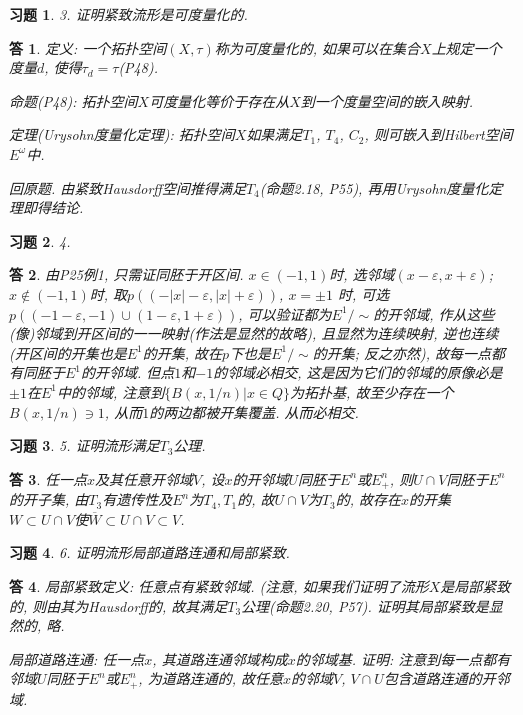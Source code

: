\documentclass{ctexart}%
\newtheorem*{exercise}{习题}
\newtheorem*{solution}{答}
\theoremstyle{definition}
\theoremstyle{remark}
\begin{document}
\begin{exercise}3. 证明紧致流形是可度量化的.
\end{exercise}
\begin{solution}
定义: 一个拓扑空间$(X,\tau)$称为可度量化的, 如果可以在集合$X$上规定一个度量$d$, 使得$\tau_d=\tau$(P48).

命题(P48): 拓扑空间$X$可度量化等价于存在从$X$到一个度量空间的嵌入映射. 

定理(Urysohn度量化定理): 拓扑空间$X$如果满足$T_1$, $T_4$, $C_2$, 则可嵌入到Hilbert空间$E^\omega$中. 

回原题. 由紧致Hausdorff空间推得满足$T_4$(命题2.18, P55), 再用Urysohn度量化定理即得结论.
\end{solution}

\begin{exercise}4. 
\end{exercise}
\begin{solution}
由P25例1, 只需证同胚于开区间. $x\in(-1,1)$时, 选邻域$(x-\varepsilon,x+\varepsilon)$; $x\notin (-1,1)$时, 取$p((-|x|-\varepsilon,|x|+\varepsilon))$, $x=\pm 1$ 时, 可选$p((-1-\varepsilon,-1)\cup(1-\varepsilon, 1+\varepsilon))$, 可以验证都为$E^1\slash \sim$的开邻域, 作从这些(像)邻域到开区间的一一映射(作法是显然的故略), 且显然为连续映射, 逆也连续(开区间的开集也是$E^1$的开集, 故在$p$下也是$E^1\slash \sim$的开集; 反之亦然), 故每一点都有同胚于$E^1$的开邻域. 但点$1$和$-1$的邻域必相交, 这是因为它们的邻域的原像必是$\pm 1$在$E^1$中的邻域, 注意到$\{B(x,1/n)|x\in Q\}$为拓扑基, 故至少存在一个$B(x, 1/n)\ni 1$, 从而$1$的两边都被开集覆盖. 从而必相交. 
\end{solution}

\begin{exercise}5. 证明流形满足$T_3$公理.
\end{exercise}
\begin{solution}
任一点$x$及其任意开邻域$V$, 设$x$的开邻域$U$同胚于$E^n$或$E^n_+$, 则$U\cap V$同胚于$E^n$的开子集, 由$T_3$有遗传性及$E^n$为$T_4,T_1$的, 故$U\cap V$为$T_3$的, 故存在$x$的开集$W\subset U\cap V$使$\overline{W}\subset U\cap V\subset V$.
\end{solution}

\begin{exercise}6. 证明流形局部道路连通和局部紧致.
\end{exercise}
\begin{solution}
局部紧致定义: 任意点有紧致邻域. (注意, 如果我们证明了流形$X$是局部紧致的, 则由其为Hausdorff的, 故其满足$T_3$公理(命题2.20, P57). 证明其局部紧致是显然的, 略. 

局部道路连通: 任一点$x$, 其道路连通邻域构成$x$的邻域基. 证明: 注意到每一点都有邻域$U$同胚于$E^n$或$E^n_+$, 为道路连通的, 故任意$x$的邻域$V$, $V\cap U$包含道路连通的开邻域. 
\end{solution}
\end{document}
